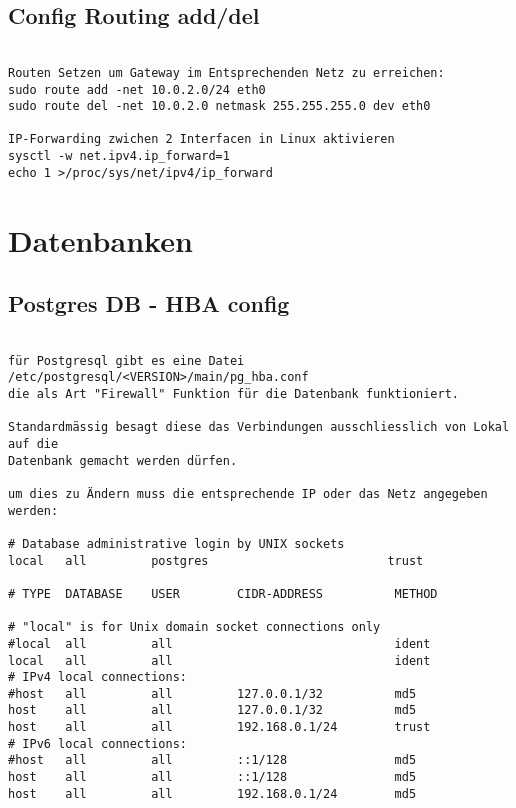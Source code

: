 \documentclass[a4paper,10pt]{report}
\begin{document}
\section{Config Routing add/del}
\begin{verbatim}
 
Routen Setzen um Gateway im Entsprechenden Netz zu erreichen:
sudo route add -net 10.0.2.0/24 eth0
sudo route del -net 10.0.2.0 netmask 255.255.255.0 dev eth0

IP-Forwarding zwichen 2 Interfacen in Linux aktivieren
sysctl -w net.ipv4.ip_forward=1
echo 1 >/proc/sys/net/ipv4/ip_forward

\end{verbatim}

\chapter{Datenbanken}

\section{Postgres DB - HBA config}
\begin{verbatim}

für Postgresql gibt es eine Datei /etc/postgresql/<VERSION>/main/pg_hba.conf
die als Art "Firewall" Funktion für die Datenbank funktioniert.

Standardmässig besagt diese das Verbindungen ausschliesslich von Lokal auf die
Datenbank gemacht werden dürfen.

um dies zu Ändern muss die entsprechende IP oder das Netz angegeben werden:

# Database administrative login by UNIX sockets
local   all         postgres                         trust

# TYPE  DATABASE    USER        CIDR-ADDRESS          METHOD

# "local" is for Unix domain socket connections only
#local  all         all                               ident
local   all         all                               ident
# IPv4 local connections:
#host   all         all         127.0.0.1/32          md5
host    all         all         127.0.0.1/32          md5
host    all         all         192.168.0.1/24        trust
# IPv6 local connections:
#host   all         all         ::1/128               md5
host    all         all         ::1/128               md5
host    all         all         192.168.0.1/24        md5

\end{verbatim}
\pagebreak
\end{document}
